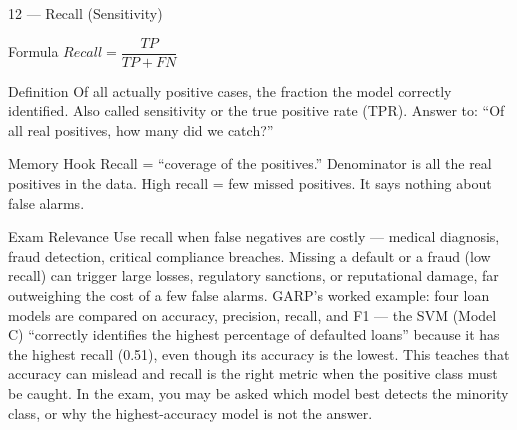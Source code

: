 \documentclass[aspectratio=169,8pt]{beamer}
\begin{document}
	\begin{frame}{12 --- Recall (Sensitivity)}
		\begin{block}{Formula}
			$Recall = \dfrac{TP}{TP + FN}$
		\end{block}
		\begin{block}{Definition}
			Of all actually positive cases, the fraction the model correctly identified. Also called sensitivity or the true positive rate (TPR). Answer to: ``Of all real positives, how many did we catch?''
		\end{block}
		\begin{block}{Memory Hook}
			Recall = ``coverage of the positives.'' Denominator is all the real positives in the data. High recall = few missed positives. It says nothing about false alarms.
		\end{block}
		\begin{block}{Exam Relevance}
			Use recall when false negatives are costly --- medical diagnosis, fraud detection, critical compliance breaches. Missing a default or a fraud (low recall) can trigger large losses, regulatory sanctions, or reputational damage, far outweighing the cost of a few false alarms. GARP's worked example: four loan models are compared on accuracy, precision, recall, and F1 --- the SVM (Model C) ``correctly identifies the highest percentage of defaulted loans'' because it has the highest recall (0.51), even though its accuracy is the lowest. This teaches that accuracy can mislead and recall is the right metric when the positive class must be caught. In the exam, you may be asked which model best detects the minority class, or why the highest-accuracy model is not the answer.
		\end{block}
	\end{frame}
	
\end{document}
